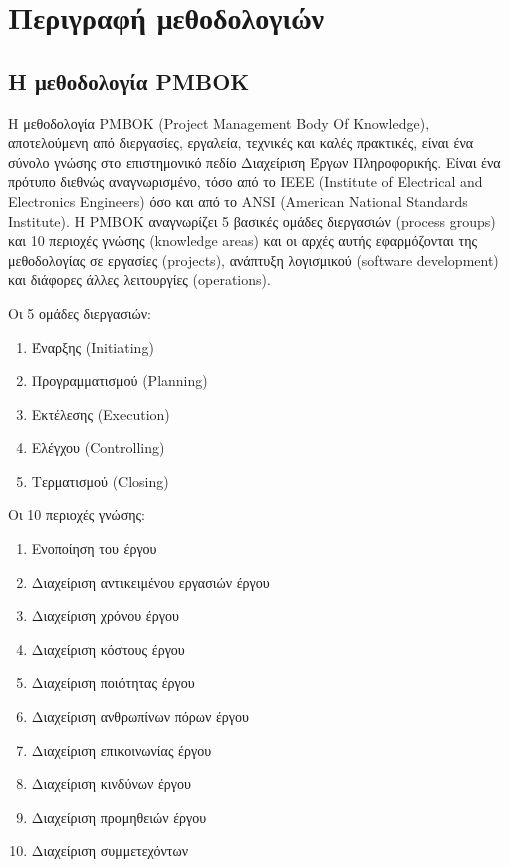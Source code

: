 \documentclass[12pt]{turabian-researchpaper}
\begin{document}
\section{Περιγραφή μεθοδολογιών}\label{methods}
\newpage\subsection{Η μεθοδολογία PMBOK}\label{method_pmbok}
Η μεθοδολογία PMBOK (Project Management Body Οf Knowledge), αποτελούμενη από διεργασίες, εργαλεία, τεχνικές και καλές πρακτικές, είναι ένα σύνολο γνώσης στο επιστημονικό πεδίο Διαχείριση Έργων Πληροφορικής. Είναι ένα πρότυπο διεθνώς αναγνωρισμένο, τόσο από το IEEE (Institute of Electrical and Electronics Engineers) όσο και από το ANSI (American National Standards Institute). Η PMBOK αναγνωρίζει 5 βασικές ομάδες διεργασιών (process groups) και 10 περιοχές γνώσης (knowledge areas) και οι αρχές αυτής εφαρμόζονται της μεθοδολογίας σε εργασίες (projects), ανάπτυξη λογισμικού (software development) και διάφορες άλλες λειτουργίες (operations). \par
{\parindent0pt
    Οι 5 ομάδες διεργασιών:
    \begin{enumerate}
        \item Έναρξης (Initiating)
        \item Προγραμματισμού (Planning)
        \item Εκτέλεσης (Execution)
        \item Ελέγχου (Controlling)
        \item Τερματισμού (Closing)
    \end{enumerate}
    Οι 10 περιοχές γνώσης:
    \begin{enumerate}
        \item Ενοποίηση του έργου
        \item Διαχείριση αντικειμένου εργασιών έργου
        \item Διαχείριση χρόνου έργου
        \item Διαχείριση κόστους έργου
        \item Διαχείριση ποιότητας έργου
        \item Διαχείριση ανθρωπίνων πόρων έργου
        \item Διαχείριση επικοινωνίας έργου
        \item Διαχείριση κινδύνων έργου
        \item Διαχείριση προμηθειών έργου
        \item Διαχείριση συμμετεχόντων
    \end{enumerate}
}
\end{document}
